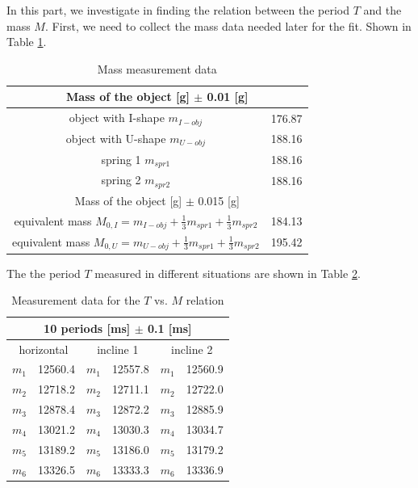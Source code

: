 In this part, we investigate in finding the relation between the period $T$ and 
the mass $M$.
First, we need to collect the mass data needed later for the fit. Shown in Table \ref{dataMass}.

\begin{table}[H]
	\centering
	\begin{tabular}{|c|c|}
	\hline
	\multicolumn{2}{|c|}{Mass of the object [g] $\pm$ 0.01 [g]} \\ \hline
	object with I-shape $m_{I-obj}$  & 176.87 \\ \hline
	object with U-shape $m_{U-obj}$  & 188.16 \\ \hline
	spring 1 			$m_{spr1}$ & 188.16 \\ \hline
	spring 2 			$m_{spr2}$ & 188.16 \\ \hline \hline
	\multicolumn{2}{|c|}{Mass of the object [g] $\pm$ 0.015 [g]} \\ \hline 
	equivalent mass		$M_{0,I} = m_{I-obj} + \frac{1}{3} m_{spr1} + \frac{1}{3} m_{spr2} $ & 184.13 \\ \hline 
	equivalent mass		$M_{0,U} = m_{U-obj} + \frac{1}{3} m_{spr1} + \frac{1}{3} m_{spr2} $ & 195.42 \\ \hline 
	\end{tabular}
	\caption{Mass measurement data}
	\label{dataMass}
\end{table}


The the period $T$ measured in different situations are shown in Table \ref{dataTime}.

\begin{table}[H]
	\centering
	\begin{tabular}{|c|c||c|c||c|c|}
	\hline
	\multicolumn{6}{|c|}{10 periods [ms] $\pm$ 0.1 [ms]} \\ \hline
    \multicolumn{2}{|c||}{horizontal}  &
     \multicolumn{2}{|c||}{incline 1}  &
     \multicolumn{2}{|c|}{incline 2}  \\ \hline
	$m_1$ & 12560.4 & $m_1$ & 12557.8 & $m_1$ & 12560.9 \\ \hline
	$m_2$ & 12718.2 & $m_2$ & 12711.1 & $m_2$ & 12722.0 \\ \hline
	$m_3$ & 12878.4 & $m_3$ & 12872.2 & $m_3$ & 12885.9 \\ \hline
	$m_4$ & 13021.2 & $m_4$ & 13030.3 & $m_4$ & 13034.7 \\ \hline
	$m_5$ & 13189.2 & $m_5$ & 13186.0 & $m_5$ & 13179.2 \\ \hline
	$m_6$ & 13326.5 & $m_6$ & 13333.3 & $m_6$ & 13336.9 \\ \hline
	\end{tabular}
	\caption{Measurement data for the $T$ vs. $M$ relation}
	\label{dataTime}
\end{table}

